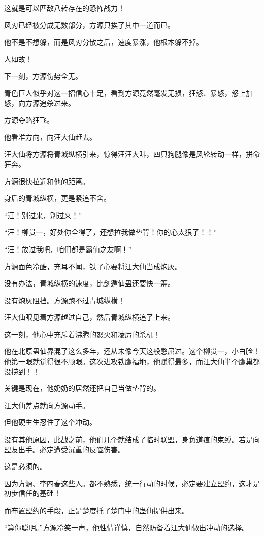 \begin{this_body}
这就是可以匹敌八转存在的恐怖战力！

风刃已经被分成无数部分，方源只挨了其中一道而已。

他不是不想躲，而是风刃分散之后，速度暴涨，他根本躲不掉。

人如故！

下一刻，方源伤势全无。

青色巨人似乎对这一招信心十足，看到方源竟然毫发无损，狂怒、暴怒，怒上加怒，向方源追杀过来。

方源夺路狂飞。

他看准方向，向汪大仙赶去。

汪大仙将方源将青城纵横引来，惊得汪汪大叫，四只狗腿像是风轮转动一样，拼命狂奔。

方源很快拉近和他的距离。

身后的青城纵横，更是紧追不舍。

“汪！别过来，别过来！”

“汪！柳贯一，好处你全得了，还想拉我做垫背！你的心太狠了！！”

“汪！放过我吧，咱们都是霸仙之友啊！”

方源面色冷酷，充耳不闻，铁了心要将汪大仙当成炮灰。

没有办法，青城纵横的速度，比剑遁仙蛊还要快一筹。

没有炮灰阻挡。方源跑不过青城纵横！

汪大仙眼见着方源越过自己，然后青城纵横追了上来。

这一刻，他心中充斥着沸腾的怒火和凌厉的杀机！

他在北原蛊仙界混了这么多年，还从未像今天这般憋屈过。这个柳贯一，小白脸！他第一眼就觉得很不顺眼。这次进攻铁鹰福地，他赚得最多，而汪大仙半个鹰巢都没捞到！！

关键是现在，他奶奶的居然还把自己当做垫背的。

汪大仙差点就向方源动手。

但他硬生生忍住了这个冲动。

没有其他原因，此战之前，他们几个就结成了临时联盟，身负道痕的束缚。若是向盟友出手。必定遭受沉重的反噬伤害。

这是必须的。

因为方源、李四春这些人。都不熟悉，统一行动的时候，必定要建立盟约，这才是初步信任的基础！

而布置盟约的手段，正是楚度托了楚门中的蛊仙提供出来。

“算你聪明。”方源冷笑一声，他性情谨慎，自然防备着汪大仙做出冲动的选择。


\end{this_body}
